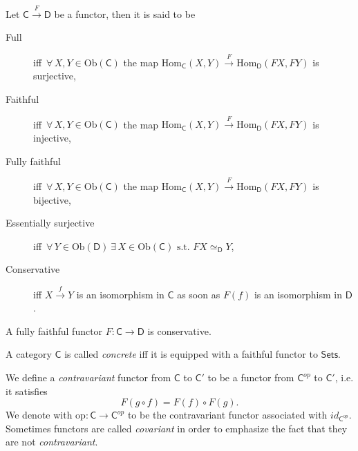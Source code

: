 \begin{defn}
	Let $\mathsf{C} \xrightarrow{F} \mathsf{D}$ be a functor, then it is said to be
	\begin{description}
		\item[Full] iff $\,\forall\, X,Y \in \mathrm{Ob} \left(\mathsf{C}\right)$ the map $\mathrm{Hom}_{\mathsf{C}} \left( X, Y \right) \xrightarrow{F} \mathrm{Hom}_{\mathsf{D}} \left( FX, FY \right)$ is surjective,
		\item[Faithful] iff $\,\forall\, X,Y \in \mathrm{Ob} \left(\mathsf{C}\right)$ the map $\mathrm{Hom}_{\mathsf{C}} \left( X, Y \right) \xrightarrow{F} \mathrm{Hom}_{\mathsf{D}} \left( FX, FY \right)$ is injective,
		\item[Fully faithful] iff $\,\forall\, X,Y \in \mathrm{Ob} \left(\mathsf{C}\right)$ the map $\mathrm{Hom}_{\mathsf{C}} \left( X, Y \right) \xrightarrow{F} \mathrm{Hom}_{\mathsf{D}} \left( FX, FY \right)$ is bijective,
		\item[Essentially surjective] iff $\,\forall\, Y \in \mathrm{Ob} \left(\mathsf{D}\right)\ \exists\, X \in \mathrm{Ob} \left(\mathsf{C}\right) \text{ s.t. } FX \simeq_{\mathsf{D}} Y$,
		\item[Conservative] iff $X \xrightarrow{f} Y$ is an isomorphism in $\mathsf{C}$ as soon as $F(f)$ is an isomorphism in $\mathsf{D}$.
	\end{description} 
\end{defn}

\begin{rem}
	A fully faithful functor $F: \mathsf{C} \to \mathsf{D}$ is conservative.
\end{rem}


\begin{defn}
	A category $\mathsf{C}$ is called {\em concrete} iff it is equipped with a faithful functor to $\mathsf{Sets}$.
\end{defn}


\begin{defn}
	We define a {\em contravariant} functor from $\mathsf{C}$ to $\mathsf{C}'$ to be a functor from $\mathsf{C}^{op}$ to $\mathsf{C}'$, i.e. it satisfies
	\begin{equation}
		F(g \circ f) = F(f) \circ F(g)
	.\end{equation}
	We denote with $\mathrm{op}: \mathsf{C} \to \mathsf{C}^{op}$ to be the contravariant functor associated with $id_{\mathsf{C}^{op}}$.
	Sometimes functors are called {\em covariant} in order to emphasize the fact that they are not {\em contravariant}.
\end{defn}

